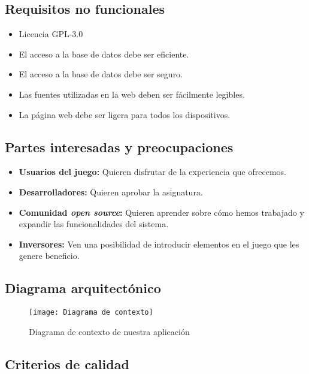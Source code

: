 \subsection{Requisitos no funcionales}

\begin{itemize}
	\item
		Licencia GPL-3.0
	\item
		El acceso a la base de datos debe ser eficiente.
	\item
		El acceso a la base de datos debe ser seguro.
	\item
		Las fuentes utilizadas en la web deben ser fácilmente legibles.
	\item
		La página web debe ser ligera para todos los dispositivos.
\end{itemize}

\subsection{Partes interesadas y preocupaciones}

\begin{itemize}
	\item
		\textbf{Usuarios del juego:}
		Quieren disfrutar de la experiencia que ofrecemos.
	\item
		\textbf{Desarrolladores:}
		Quieren aprobar la asignatura.
	\item
		\textbf{Comunidad \textit{open source}:}
		Quieren aprender sobre cómo hemos trabajado y expandir las funcionalidades del sistema.
	\item
		\textbf{Inversores:}
		Ven una posibilidad de introducir elementos en el juego que les genere beneficio.
\end{itemize}

\subsection{Diagrama arquitectónico}

\begin{figure}[!ht]
\begin{center}
	\texttt{[image: Diagrama de contexto]}
\end{center}
\caption{Diagrama de contexto de nuestra aplicación}
\end{figure}

\subsection{Criterios de calidad}

